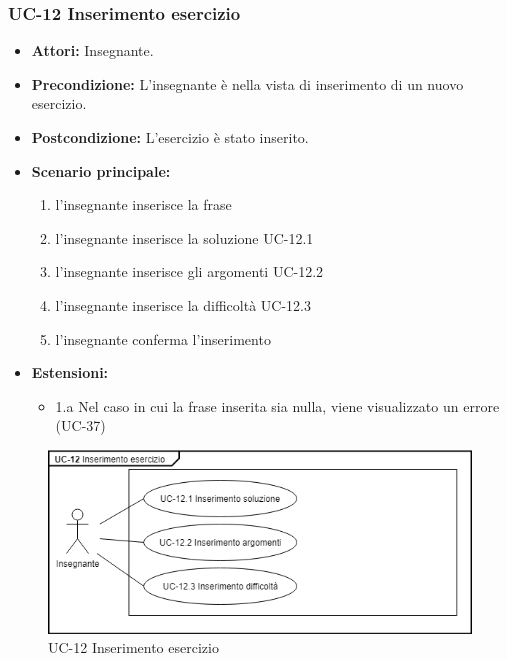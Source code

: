 \subsubsection{UC-12 Inserimento esercizio}
	\begin{itemize}
		\item \textbf{Attori: }Insegnante.
		\item \textbf{Precondizione: }L'insegnante è nella vista di inserimento di un nuovo esercizio.
		\item \textbf{Postcondizione: }L'esercizio è stato inserito.
		\item \textbf{Scenario principale: }
			\begin{enumerate} 
				\item l'insegnante inserisce la frase
				\item l'insegnante inserisce la soluzione UC-12.1
				\item l'insegnante inserisce gli argomenti UC-12.2
				\item l'insegnante inserisce la difficoltà UC-12.3
				\item l'insegnante conferma l'inserimento
			\end{enumerate}
		\item \textbf{Estensioni:} 
			\begin{itemize}
				\item 1.a Nel caso in cui la frase inserita sia nulla, viene visualizzato un errore (UC-37)
			\end{itemize}
	\end{itemize}
	\begin{figure}[h]
		\centering
		\includegraphics[scale=0.7]{images/UC-12.png}
		\caption{UC-12 Inserimento esercizio}
	\end{figure}

